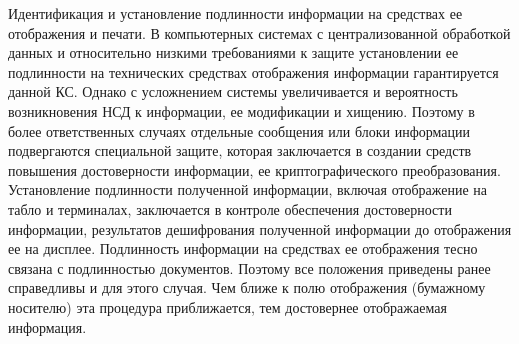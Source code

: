 \documentclass[a4paper,12pt]{extarticle}
\begin{document}
	Идентификация и установление подлинности информации на средствах ее отображения и печати. В компьютерных системах с централизованной обработкой данных и относительно низкими требованиями к защите установлении ее подлинности на технических средствах отображения информации гарантируется данной КС. Однако с усложнением системы увеличивается и вероятность возникновения НСД к информации, ее модификации и хищению. Поэтому в более ответственных случаях отдельные сообщения или блоки информации подвергаются специальной защите, которая заключается в создании средств повышения достоверности информации, ее криптографического преобразования. Установление подлинности полученной информации, включая отображение на табло и терминалах, заключается в контроле обеспечения достоверности информации, результатов дешифрования полученной информации до отображения ее на дисплее. Подлинность информации на средствах ее отображения тесно связана с подлинностью документов. Поэтому все положения приведены ранее справедливы и для этого случая. Чем ближе к полю отображения (бумажному носителю) эта процедура приближается, тем достовернее отображаемая информация.
	
\end{document}
